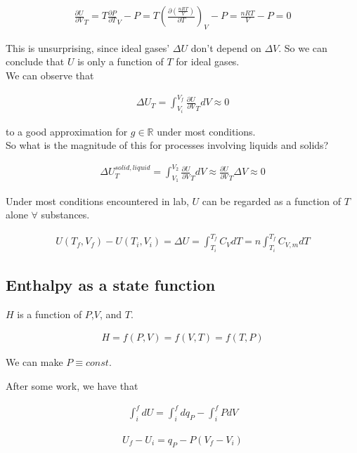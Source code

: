 \documentclass[12pt]{book}
\begin{document}
\begin{align*}
    \frac{\partial U}{\partial V}_T=T\frac{\partial P}{\partial T}_V-P=T\left(\frac{\partial \left( \frac{nRT}{V}\right)}{\partial T}\right)_V-P=\frac{nRT}{V}-P=0
\end{align*}

This is unsurprising, since ideal gases' $\Delta U$ don't depend on $\Delta V$. So we can conclude that $U$ is only a function of $T$ for ideal gases.\\We can observe that

\begin{align*}
    \Delta U_T=\int_{V_i}^{V_f}\frac{\partial U}{\partial V}_T dV\approx 0
\end{align*}

to a good approximation for $g\in \mathbb{R}$ under most conditions.\\ So what is the magnitude of this for processes involving liquids and solids?

\begin{align*}
    \Delta U_T^{solid,liquid}=\int_{V_1}^{V_2}\frac{\partial U}{\partial V}_T dV\approx \frac{\partial U}{\partial V}_T\Delta V\approx 0
\end{align*}

Under most conditions encountered in lab, $U$ can be regarded as a function of $T$ alone $\forall$ substances.

\begin{align*}
    U(T_f,V_f)-U(T_i,V_i)=\Delta U=\int_{T_i}^{T_f}C_V dT=n\int_{T_i}^{T_f}C_{V,m}dT
\end{align*}

\subsection*{Enthalpy as a state function}

$H$ is a function of $P$,$V$, and $T$.

\begin{align*}
    H=f(P,V)=f(V,T)=f(T,P)
\end{align*}

We can make $P\equiv const$.

After some work, we have that

\begin{align*}
    \int_{i}^{f}dU=\int_{i}^{f}dq_P-\int_{i}^{f}PdV
\end{align*}

\begin{align*}
    U_f-U_i=q_P-P(V_f-V_i)
\end{align*}
\end{document}
